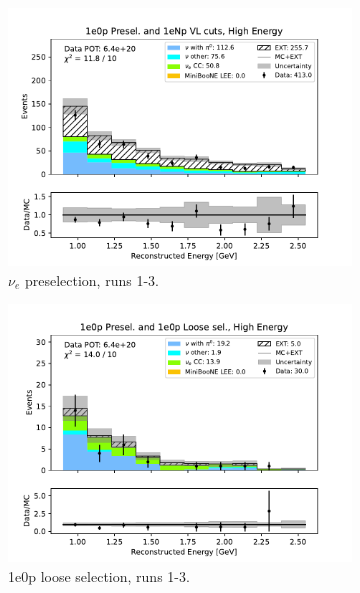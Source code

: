 \begin{figure}[H]
    \centering
    \begin{subfigure}{0.5\linewidth}
    \includegraphics[width=\linewidth]{technote/Sidebands/Figures/FarSideband/far_sideband_reco_e_run123_ZP_ZP_HIGH_ENERGY.pdf}
    \caption{$\nu_e$ preselection, runs 1-3.}
    \end{subfigure}%
    \begin{subfigure}{0.5\linewidth}
    \includegraphics[width=\linewidth]{technote/Sidebands/Figures/FarSideband/far_sideband_reco_e_run123_ZP_ZPLOOSESEL_HIGH_ENERGY.pdf}
    \caption{1e0p loose selection, runs 1-3.}
    \end{subfigure}
    \begin{subfigure}{0.5\linewidth}

\end{subfigure}
\end{figure}
